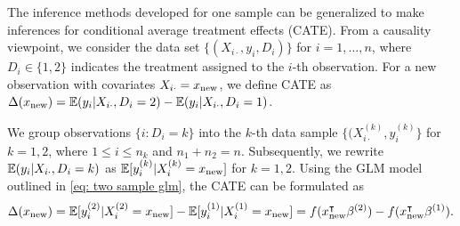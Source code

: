 The inference methods developed for one sample can be generalized to make inferences for conditional average treatment effects (CATE). From a causality viewpoint, we consider the data set $\{(X_{i\cdot}, y_i, D_i)\}$ for $i=1,\ldots,n$, where $D_i\in \{1,2\}$ indicates the treatment assigned to the $i$-th observation. For a new observation with covariates $X_{i\cdot}=x_{\rm new}$, we define CATE as
$\Delta(x_{\rm new}) = \mathbb{E}(y_i|X_{i\cdot}, D_i=2) - \mathbb{E}(y_i|X_{i\cdot}, D_i=1)$.

We group observations $\{i: D_i=k\}$ into the $k$-th data sample $\{(X_{i\cdot}^{(k)}, y_i^{(k)}\}$ for $k=1,2$, where $1\leq i\leq n_k$ and $n_1+n_2 = n$. Subsequently, we rewrite $\mathbb{E}(y_i|X_{i\cdot}, D_i=k)$ as $\mathbb{E}[y_i^{(k)}|X_i^{(k)}=x_{\rm new}]$ for $k=1,2.$
Using the GLM model outlined in \eqref{eq: two sample glm}, the CATE can be formulated as
$$\Delta(x_{\rm new}) = \mathbb{E}[y_i^{(2)}|X_i^{(2)}=x_{\rm new}] - \mathbb{E}[y_i^{(1)}|X_i^{(1)}=x_{\rm new}] = f(x_{\rm new}^\intercal \beta^{(2)}) - f(x_{\rm new}^\intercal \beta^{(1)}).$$




